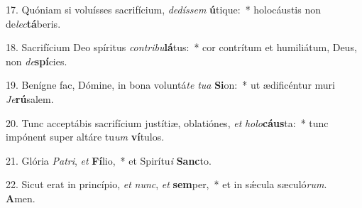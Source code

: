 17. Quóniam si voluísses sacrifícium, \textit{de}\textit{dís}\textit{sem} \textbf{ú}tique:~*  holocáustis non de\textit{lec}\textbf{tá}beris.\

18. Sacrifícium Deo spíritus \textit{con}\textit{tri}\textit{bu}\textbf{lá}tus:~*  cor contrítum et humiliátum, Deus, non \textit{de}\textbf{spí}cies.\

19. Benígne fac, Dómine, in bona voluntá\textit{te} \textit{tu}\textit{a} \textbf{Si}on:~*  ut ædificéntur muri \textit{Je}\textbf{rú}salem.\

20. Tunc acceptábis sacrifícium justítiæ, oblatiónes, \textit{et} \textit{ho}\textit{lo}\textbf{cáus}ta:~*  tunc impónent super altáre tu\textit{um} \textbf{ví}tulos.\

21. Glória \textit{Pa}\textit{tri}, \textit{et} \textbf{Fí}lio,~*  et Spirítu\textit{i} \textbf{Sanc}to.\

22. Sicut erat in princípio, \textit{et} \textit{nunc}, \textit{et} \textbf{sem}per,~*  et in sǽcula sæculó\textit{rum}. \textbf{A}men.\

